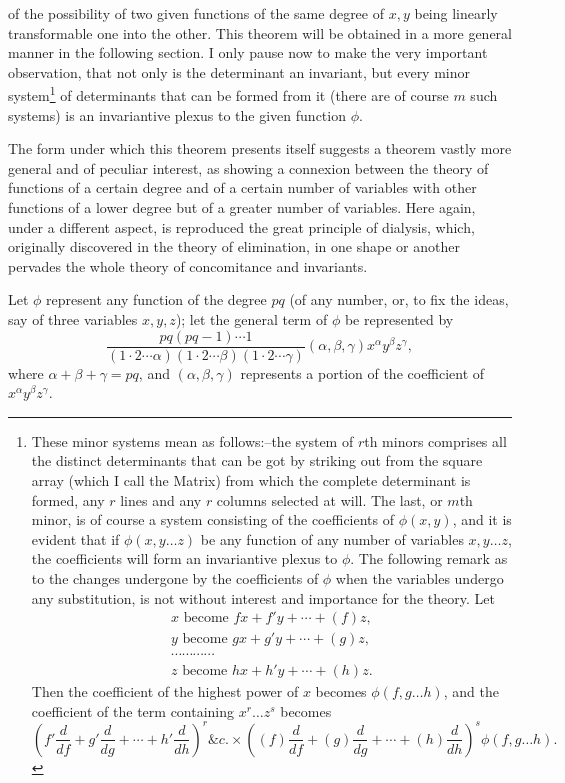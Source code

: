 \documentclass[11pt]{article}
\newcommand{\sourcepage}[1]{\marginpar{\scriptsize p.~#1}}
\begin{document}
{{\sourcepage{294}
of the possibility of two given functions of the same degree of $x,y$ being linearly transformable one into the other. This theorem will be obtained in a more general manner in the following section. I only pause now to make the very important observation, that not only is the determinant an invariant, but every minor system\footnote{These minor systems mean as follows:--the system of $r$th minors comprises all the distinct determinants that can be got by striking out from the square array (which I call the Matrix) from which the complete determinant is formed, any $r$ lines and any $r$ columns selected at will. The last, or $m$th minor, is of course a system consisting of the coefficients of $\phi(x,y)$, and it is evident that if $\phi(x,y\ldots z)$ be any function of any number of variables $x,y\ldots z$, the coefficients will form an invariantive plexus to $\phi$. The following remark as to the changes undergone by the coefficients of $\phi$ when the variables undergo any substitution, is not without interest and importance for the theory. Let
\[
\begin{gathered}
x\text{ become }fx+f'y+\cdots+(f)z,\\
y\text{ become }gx+g'y+\cdots+(g)z,\\
\cdots\cdots\cdots\cdots\\
z\text{ become }hx+h'y+\cdots+(h)z.
\end{gathered}
\]
Then the coefficient of the highest power of $x$ becomes $\phi(f,g\ldots h)$, and the coefficient of the term containing $x^r\ldots z^s$ becomes
\[
\left(f'\frac{d}{df}+g'\frac{d}{dg}+\cdots+h'\frac{d}{dh}\right)^r\&c.\times
\left((f)\frac{d}{df}+(g)\frac{d}{dg}+\cdots+(h)\frac{d}{dh}\right)^s\phi(f,g\ldots h).
\]}
of determinants that can be formed from it (there are of course $m$ such systems) is an invariantive plexus to the given function $\phi$.

The form under which this theorem presents itself suggests a theorem vastly more general and of peculiar interest, as showing a connexion between the theory of functions of a certain degree and of a certain number of variables with other functions of a lower degree but of a greater number of variables. Here again, under a different aspect, is reproduced the great principle of dialysis, which, originally discovered in the theory of elimination, in one shape or another pervades the whole theory of concomitance and invariants.

Let $\phi$ represent any function of the degree $pq$ (of any number, or, to fix the ideas, say of three variables $x,y,z$); let the general term of $\phi$ be represented by
\[
\frac{pq(pq-1)\cdots1}{(1\cdot2\cdots\alpha)(1\cdot2\cdots\beta)(1\cdot2\cdots\gamma)}(\alpha,\beta,\gamma)x^\alpha y^\beta z^\gamma,
\]
where $\alpha+\beta+\gamma=pq$, and $(\alpha,\beta,\gamma)$ represents a portion of the coefficient of $x^\alpha y^\beta z^\gamma$.

}}
\end{document}
